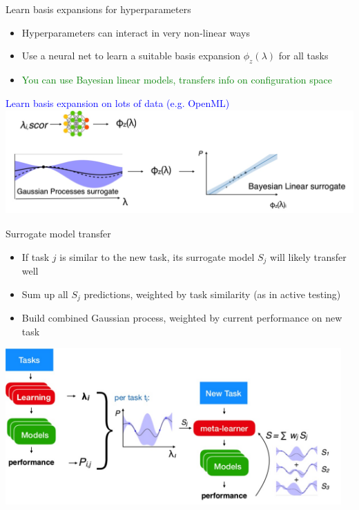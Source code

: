 \begin{frame}{Learn basis expansions for hyperparameters}

    \begin{itemize}
        \item Hyperparameters can interact in very non-linear ways
        \item Use a neural net to learn a suitable basis expansion $\phi _z(\lambda)$ for all tasks
        \item \textcolor{green}{You can use Bayesian linear models, transfers info on configuration space}
    \end{itemize}
\small \textcolor{blue}{Learn basis expansion on lots of data (e.g. OpenML)}
\centering\includegraphics[height=4cm]{image/img202530.jpg}

\end{frame}

\begin{frame}{Surrogate model transfer}
    \begin{itemize}
        \item If task $j$ is similar to the new task, its surrogate model $S_j$ will likely transfer well
        \item Sum up all $S_j$ predictions, weighted by task similarity (as in active testing)
        \item Build combined Gaussian process, weighted by current performance on new task
    \end{itemize}
\centering\includegraphics[height=6cm]{image/img202917.jpg}

\end{frame}

